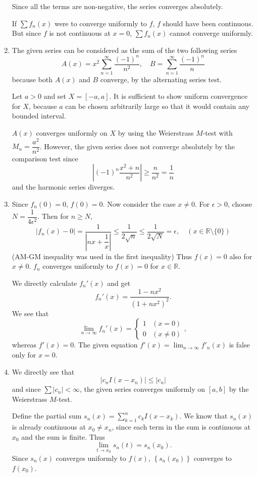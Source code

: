 \documentclass[12pt]{report}
\newcommand{\numl}[1]{\item[\large\textbf{\sffamily #1.}]}
\newcommand{\ds}{\displaystyle}
\newcommand{\bs}{\setminus}
\newcommand{\abs}[1]{\left| #1 \right|}
\newcommand{\seq}[1]{\left\{ #1 \right\}}
\newcommand{\ra}{\rightarrow}
\newcommand{\R}{\mathbb{R}}
\begin{document}
\begin{enumerate}
    Since all the terms are non-negative, the series converges absolutely.

    If \(\sum f_n(x)\) were to converge uniformly to \(f\), \(f\) should have been continuous. But since \(f\) is not continuous at \(x = 0\), \(\sum f_n(x)\) cannot converge uniformly.

    \numl{4} The given series can be considered as the sum of the two following series
    \[
        A(x) = x^2 \sum_{n=1}^\infty \frac{(-1)^n}{n^2}, \quad B = \sum_{n=1}^\infty \frac{(-1)^n}{n}
    \]
    because both \(A(x)\) and \(B\) converge, by the alternating series test.

    Let \(a > 0\) and set \(X = [-a, a]\). It is sufficient to show uniform convergence for \(X\), because \(a\) can be chosen arbitrarily large so that it would contain any bounded interval.

    \(A(x)\) converges uniformly on \(X\) by using the Weierstrass \(M\)-test with \(M_n = \dfrac{a^2}{n^2}\). However, the given series does not converge absolutely by the comparison test since
    \[
        \abs{(-1)^n \frac{x^2 + n}{n^2}} \geq \frac{n}{n^2} = \frac{1}{n}
    \]
    and the harmonic series diverges.

    \numl{5} Since \(f_n(0) = 0\), \(f(0) = 0\). Now consider the case \(x \neq 0\). For \(\epsilon > 0\), choose \(N = \dfrac{1}{4\epsilon^2}\). Then for \(n \geq N\),
    \[
        \abs{f_n(x) - 0} = \frac{1}{\abs{nx + \dfrac{1}{x}}} \leq \frac{1}{2\sqrt{n}} \leq \frac{1}{2\sqrt{N}} = \epsilon, \quad (x \in \R\bs\{0\})
    \]
    (AM-GM inequality was used in the first inequality) Thus \(f(x) = 0\) also for \(x \neq 0\). \(f_n\) converges uniformly to \(f(x) = 0\) for \(x \in \R\).

    We directly calculate \(f_n'(x)\) and get
    \[
        f_n'(x) = \frac{1 - nx^2}{(1 + nx^2)^2}.
    \]
    We see that
    \[
        \lim_{n\ra\infty} f_n'(x) = \begin{cases}
            1 & (x = 0) \\ 0 & (x \neq 0)
        \end{cases},
    \]
    whereas \(f'(x) = 0\). The given equation \(f'(x) = \ds \lim_{n \ra \infty} f'_n(x)\) is false only for \(x = 0\).

    \numl{6} We directly see that
    \[
        \abs{c_n I(x - x_n)} \leq \abs{c_n}
    \]
    and since \(\sum \abs{c_n} < \infty\), the given series converges uniformly on \([a, b]\) by the Weierstrass \(M\)-test.

    Define the partial sum \(s_n(x) = \ds \sum_{k =1}^n c_k I(x - x_k)\). We know that \(s_n(x)\) is already continuous at \(x_0 \neq x_n\), since each term in the sum is continuous at \(x_0\) and the sum is finite. Thus
    \[
        \lim_{t \ra x_0} s_n(t) = s_n(x_0).
    \]
    Since \(s_n(x)\) converges uniformly to \(f(x)\), \(\seq{s_n(x_0)}\) converges to \(f(x_0)\).


\end{enumerate}
\end{document}
